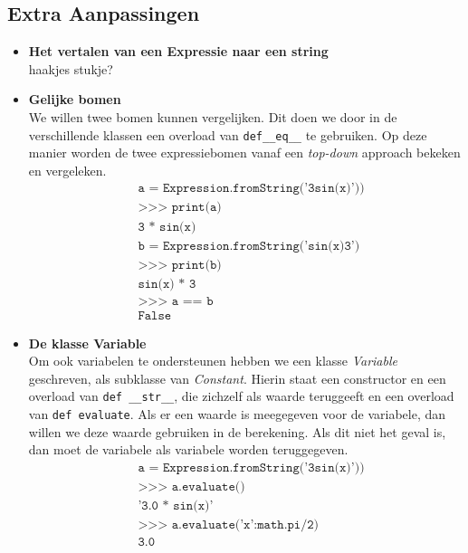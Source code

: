 \documentclass[12pt]{article}
\begin{document}
\subsection*{Extra Aanpassingen}
\begin{itemize}
\item \textbf{Het vertalen van een Expressie naar een string} \\
haakjes stukje?

\item \textbf{Gelijke bomen} \\
We willen twee bomen kunnen vergelijken. Dit doen we door in de verschillende klassen een overload van \texttt{def\_\_eq\_\_} te gebruiken. Op deze manier worden de twee expressiebomen vanaf een \textit{top-down} approach bekeken en vergeleken.
\begin{align*}
&\texttt{a = Expression.fromString('3sin(x)'))}\\
&\texttt{>>> print(a)}\\
&\texttt{3 * sin(x)}\\
&\texttt{b = Expression.fromString('sin(x)3')}\\
&\texttt{>>> print(b)}\\
&\texttt{sin(x) * 3}\\
&\texttt{>>> a == b}\\
&\texttt{False}
\end{align*}

\item \textbf{De klasse Variable} \\
Om ook variabelen te ondersteunen hebben we een klasse \textit{Variable} geschreven, als subklasse van \textit{Constant}. Hierin staat een constructor en een overload van  \texttt{def \_\_str\_\_}, die zichzelf als waarde teruggeeft en een overload van \texttt{def evaluate}. Als er een waarde is meegegeven voor de variabele, dan willen we deze waarde gebruiken in de berekening. Als dit niet het geval is, dan moet de variabele als variabele worden teruggegeven.
\begin{align*}
&\texttt{a = Expression.fromString('3sin(x)'))}\\
&\texttt{>>> a.evaluate()}\\
&\texttt{'3.0 * sin(x)'}\\
&\texttt{>>> a.evaluate({'x':math.pi/2})}\\
&\texttt{3.0}\\
\end{align*}



\end{itemize}
\end{document}
